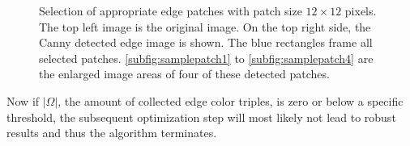 \begin{figure}[p]
{  }
  \caption[Selection of appropriate edge patches]{Selection of appropriate edge patches with patch size $12 \times 12$ pixels. The top left image is the original image. On the top right side, the Canny detected edge image is shown. The blue rectangles frame all selected patches. \autoref{subfig:samplepatch1} to \autoref{subfig:samplepatch4} are the enlarged image areas of four of these detected patches.}
  \label{fig:patchselection}
\end{figure}
Now if $\left|\Omega\right|$, the amount of collected edge color triples, is zero or below a specific threshold, the subsequent optimization step will most likely not lead to robust results and thus the algorithm terminates.

